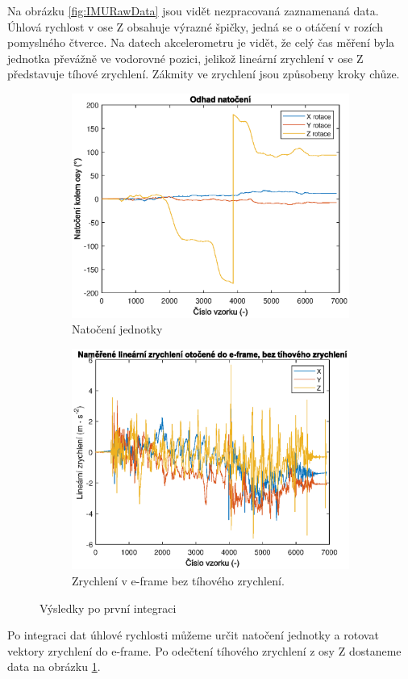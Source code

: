 Na obrázku \ref{fig:IMURawData} jsou vidět nezpracovaná zaznamenaná data. Úhlová rychlost v ose Z obsahuje výrazné špičky, jedná se o otáčení v rozích pomyslného čtverce. Na datech akcelerometru je vidět, že celý čas měření byla jednotka převážně ve vodorovné pozici, jelikož lineární zrychlení v ose Z představuje tíhové zrychlení. Zákmity ve zrychlení jsou způsobeny kroky chůze.

\begin{figure}[h]
     \centering
     \begin{subfigure}[b]{0.49\textwidth}
         \centering
         \includegraphics[width=\textwidth]{obrazky/matlab/1measOrient}
         \caption{Natočení jednotky}     
     \end{subfigure}
     \hfill
     \centering
     \begin{subfigure}[b]{0.49\textwidth}
         \centering
         \includegraphics[width=\textwidth]{obrazky/matlab/1measAccelEframeWithoutG}
         \caption{Zrychlení v e-frame bez tíhového zrychlení.}   
     \end{subfigure}

        \caption{Výsledky po první integraci}
        \label{fig:rotationAccel}
\end{figure}

Po integraci dat úhlové rychlosti můžeme určit natočení jednotky a rotovat vektory zrychlení do e-frame. Po odečtení tíhového zrychlení z osy Z dostaneme data na obrázku \ref{fig:rotationAccel}.

